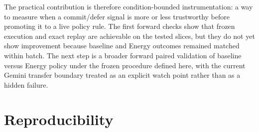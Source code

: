 \documentclass[11pt,a4paper]{article}
\begin{document}
The practical contribution is therefore condition-bounded instrumentation: a way to measure when a commit/defer signal is more or less trustworthy before promoting it to a live policy rule. The first forward checks show that frozen execution and exact replay are achievable on the tested slices, but they do not yet show improvement because baseline and Energy outcomes remained matched within batch. The next step is a broader forward paired validation of baseline versus Energy policy under the frozen procedure defined here, with the current Gemini transfer boundary treated as an explicit watch point rather than as a hidden failure.

\section{Reproducibility}
\label{sec:repro}
\end{document}
